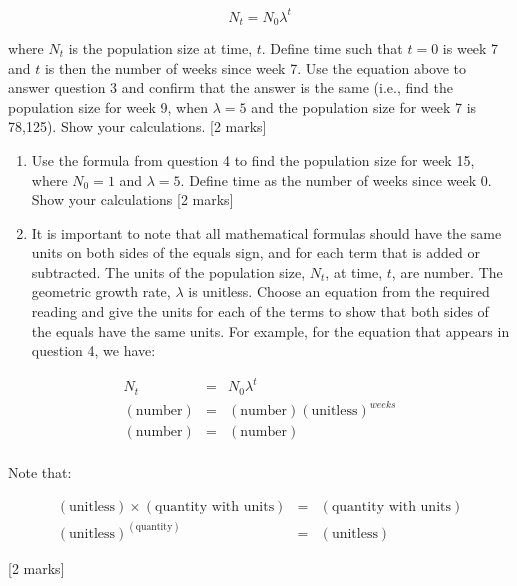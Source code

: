 \documentclass[]{book}
\begin{document}
\[
N_t = N_0\lambda^t
\]

where \(N_t\) is the population size at time, \(t\). Define time such
that \(t=0\) is week 7 and \(t\) is then the number of weeks since week
7. Use the equation above to answer question 3 and confirm that the
answer is the same (i.e., find the population size for week 9, when
\(\lambda=5\) and the population size for week 7 is 78,125). Show your
calculations. {[}2 marks{]}

\begin{enumerate}
\def\labelenumi{\arabic{enumi}.}
\setcounter{enumi}{4}
\item
  Use the formula from question 4 to find the population size for week
  15, where \(N_0=1\) and \(\lambda=5\). {Define time as the number of
  weeks since week 0}. Show your calculations {[}2 marks{]}
\item
  It is important to note that all mathematical formulas should have the
  same units on both sides of the equals sign, and for each term that is
  added or subtracted. The units of the population size, \(N_t\), at
  time, \(t\), are number. The geometric growth rate, \(\lambda\) is
  unitless. Choose an equation from the required reading and give the
  units for each of the terms to show that both sides of the equals have
  the same units. For example, for the equation that appears in question
  4, we have:
\end{enumerate}

\begin{eqnarray*}
N_t & = & N_0 \lambda^t \\
\left(\mbox{number}\right)& =&(\mbox{number}) (\mbox{unitless})^{weeks}\\
\left(\mbox{number}\right)& =& \left(\mbox{number}\right)\\
\end{eqnarray*}

Note that:

\begin{eqnarray*}
(\mbox{unitless}) \times (\mbox{quantity with units}) & = & (\mbox{quantity with units}) \\ (\mbox{unitless})^{(\mbox{quantity})}& =& (\mbox{unitless})
\end{eqnarray*}

{[}2 marks{]}
\end{document}
